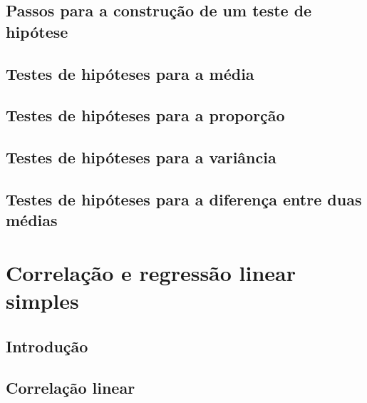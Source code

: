 \documentclass[
]{book}
\begin{document}
\hypertarget{passos-para-a-construuxe7uxe3o-de-um-teste-de-hipuxf3tese}{%
\section{Passos para a construção de um teste de hipótese}\label{passos-para-a-construuxe7uxe3o-de-um-teste-de-hipuxf3tese}}

\hypertarget{testes-de-hipuxf3teses-para-a-muxe9dia}{%
\section{Testes de hipóteses para a média}\label{testes-de-hipuxf3teses-para-a-muxe9dia}}

\hypertarget{testes-de-hipuxf3teses-para-a-proporuxe7uxe3o}{%
\section{Testes de hipóteses para a proporção}\label{testes-de-hipuxf3teses-para-a-proporuxe7uxe3o}}

\hypertarget{testes-de-hipuxf3teses-para-a-variuxe2ncia}{%
\section{Testes de hipóteses para a variância}\label{testes-de-hipuxf3teses-para-a-variuxe2ncia}}

\hypertarget{testes-de-hipuxf3teses-para-a-diferenuxe7a-entre-duas-muxe9dias}{%
\section{Testes de hipóteses para a diferença entre duas médias}\label{testes-de-hipuxf3teses-para-a-diferenuxe7a-entre-duas-muxe9dias}}

\hypertarget{chap:cor-reg}{%
\chapter{Correlação e regressão linear simples}\label{chap:cor-reg}}

\hypertarget{introduuxe7uxe3o-8}{%
\section{Introdução}\label{introduuxe7uxe3o-8}}

\hypertarget{correlauxe7uxe3o-linear}{%
\section{Correlação linear}\label{correlauxe7uxe3o-linear}}
\end{document}
